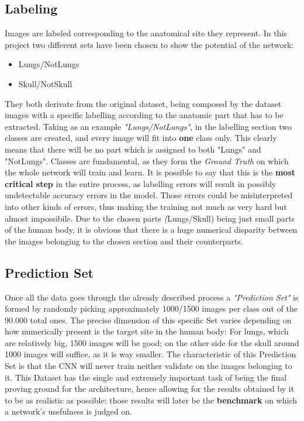 \documentclass[../main.tex]{subfiles}
\begin{document}
\subsection{Labeling}
Images are labeled corresponding to the anatomical site they represent. In this project two different sets have been chosen to show the potential of the network:
\begin{itemize}
	\item Lungs/NotLungs
	\item Skull/NotSkull
\end{itemize}

They both derivate from the original dataset, being composed by the dataset images with a specific labelling according to the anatomic part that has to be extracted. Taking as an example \textit{"Lungs/NotLungs"}, in the labelling section two classes are created, and every image will fit into \textbf{one} class only. This clearly means that there will be no part which is assigned to both "Lungs" and "NotLungs". Classes are fundamental, as they form the \textit{Ground Truth} on which the whole network will train and learn. It is possible to say that this is the \textbf{most critical step} in the entire process, as labelling errors will result in possibly undetectable accuracy errors in the model. Those errors could be misinterpreted into other kinds of errors, thus making the training not much as very hard but almost impossibile.
Due to the chosen parts \textit(Lungs/Skull) being just small parts of the human body, it is obvious that there is a huge numerical disparity between the images belonging to the chosen section and their counterparts.
\vspace{5mm}
\subsection{Prediction Set}
Once all the data goes through the already described process a \textit{"Prediction Set"} is formed by randomly picking approximately 1000/1500 images per class out of the 90.000 total ones. The precise dimension of this specific Set varies depending on how numerically present is the target site in the human body: For lungs, which are relatively big, 1500 images will be good; on the other side for the skull around 1000 images will suffice, as it is way smaller. The characteristic of this Prediction Set is that the CNN will never train neither validate on the images belonging to it. This Dataset has the single and extremely important task of being the final proving ground for the architecture, hence allowing for the results obtained by it to be as realistic as possible: those results will later be the \textbf{benchmark} on which a network's usefulness is judged on.\cite{Karpathy2018}
\end{document}
